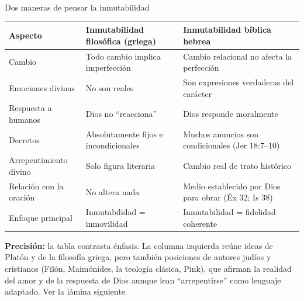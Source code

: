 \documentclass[hyperref={bookmarks=false},aspectratio=169]{beamer}
\newcommand{\precision}[1]{{\footnotesize\color{gris}\textbf{Precisión:} #1}}
\begin{document}
\begin{frame}{Dos maneras de pensar la inmutabilidad}
\scriptsize\renewcommand{\arraystretch}{1.13}
\begin{tabular}{@{}>{\RaggedRight\arraybackslash}p{2.3cm}>{\RaggedRight\arraybackslash}p{4.5cm}>{\RaggedRight\arraybackslash}p{5.0cm}@{}}
\toprule
\textbf{Aspecto} & \textbf{Inmutabilidad filosófica (griega)} & \textbf{Inmutabilidad bíblica hebrea} \\ \midrule
Cambio & Todo cambio implica imperfección & Cambio relacional no afecta la perfección \\
Emociones divinas & No son reales & Son expresiones verdaderas del carácter \\
Respuesta a humanos & Dios no ``reacciona'' & Dios responde moralmente \\
Decretos & Absolutamente fijos e incondicionales & Muchos anuncios son condicionales (Jer 18:7--10) \\
Arrepentimiento divino & Solo figura literaria & Cambio real de trato histórico \\
Relación con la oración & No altera nada & Medio establecido por Dios para obrar (Éx 32; Is 38) \\
Enfoque principal & Inmutabilidad = inmovilidad & Inmutabilidad = fidelidad coherente \\
\bottomrule
\end{tabular}\par\smallskip
\precision{la tabla contrasta énfasis. La columna izquierda reúne ideas de Platón y de la filosofía griega, pero también posiciones de autores judíos y cristianos (Filón, Maimónides, la teología clásica, Pink), que afirman la realidad del amor y de la respuesta de Dios aunque lean ``arrepentirse'' como lenguaje adaptado. Ver la lámina siguiente.}
\end{frame}
\end{document}
